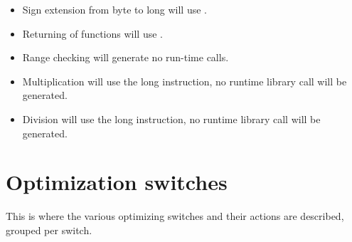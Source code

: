 \begin{itemize}
\item Sign extension from byte to long will use .
\item Returning of functions will use .
\item Range checking will generate no run-time calls.
\item Multiplication will use the long  instruction, no
runtime library call will be generated.
\item Division will use the long  instruction, no
runtime library call will be generated.
\end{itemize}

\section{Optimization switches}
This is where the various optimizing switches and their actions are
described, grouped per switch.

